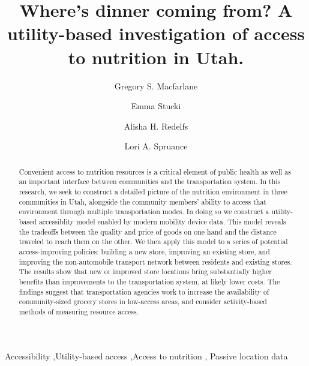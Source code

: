 \documentclass[
  letterpaper,
  number,
  review,
  3p]{elsarticle}
\begin{document}
\begin{frontmatter}
\title{Where's dinner coming from? A utility-based investigation of
access to nutrition in Utah.}
\author[1]{Gregory S. Macfarlane%
%
}
\author[1]{Emma Stucki%
%
}

\author[2]{Alisha H. Redelfs%
%
}

\author[2]{Lori A. Spruance%
%
}







        
\begin{abstract}
Convenient access to nutrition resources is a critical element of public
health as well as an important interface between communities and the
transportation system. In this research, we seek to construct a detailed
picture of the nutrition environment in three communities in Utah,
alongside the community members' ability to access that environment
through multiple transportation modes. In doing so we construct a
utility-based accessiblity model enabled by modern mobility device data.
This model reveals the tradeoffs between the quality and price of goods
on one hand and the distance traveled to reach them on the other. We
then apply this model to a series of potential access-improving
policies: building a new store, improving an existing store, and
improving the non-automobile transport network between residents and
existing stores. The results show that new or improved store locations
bring substantially higher benefits than improvements to the
transportation system, at likely lower costs. The findings suggest that
transportation agencies work to increase the availability of
community-sized grocery stores in low-access areas, and consider
activity-based methods of measuring resource access.
\end{abstract}





\begin{keyword}
    Accessibility \sep Utility-based access \sep Access to
nutrition \sep 
    Passive location data
\end{keyword}
\end{frontmatter}
    
\end{document}
